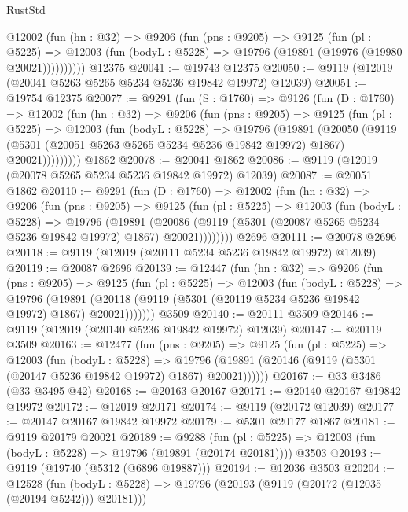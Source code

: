 \begin{lexlean}{RustStd}
\begin{coremodule}
        @12002
          (fun (hn : @32) =>
          @9206
            (fun (pns : @9205) =>
            @9125
              (fun (pl : @5225) =>
              @12003 (fun (bodyL : @5228) => @19796 (@19891 (@19976 (@19980 @20021))))))))))
    @12375
@20041 := @19743 @12375
@20050 := @9119 (@12019 (@20041 @5263 @5265 @5234 @5236 @19842 @19972) @12039)
@20051 := @19754 @12375
@20077 := @9291
    (fun (S : @1760) =>
    @9126
      (fun (D : @1760) =>
      @12002
        (fun (hn : @32) =>
        @9206
          (fun (pns : @9205) =>
          @9125
            (fun (pl : @5225) =>
            @12003
              (fun (bodyL : @5228) =>
              @19796
                (@19891
                  (@20050
                    (@9119
                      (@5301 (@20051 @5263 @5265 @5234 @5236 @19842 @19972) @1867)
                      @20021)))))))))
    @1862
@20078 := @20041 @1862
@20086 := @9119 (@12019 (@20078 @5265 @5234 @5236 @19842 @19972) @12039)
@20087 := @20051 @1862
@20110 := @9291
    (fun (D : @1760) =>
    @12002
      (fun (hn : @32) =>
      @9206
        (fun (pns : @9205) =>
        @9125
          (fun (pl : @5225) =>
          @12003
            (fun (bodyL : @5228) =>
            @19796
              (@19891
                (@20086 (@9119 (@5301 (@20087 @5265 @5234 @5236 @19842 @19972) @1867) @20021))))))))
    @2696
@20111 := @20078 @2696
@20118 := @9119 (@12019 (@20111 @5234 @5236 @19842 @19972) @12039)
@20119 := @20087 @2696
@20139 := @12447
    (fun (hn : @32) =>
    @9206
      (fun (pns : @9205) =>
      @9125
        (fun (pl : @5225) =>
        @12003
          (fun (bodyL : @5228) =>
          @19796
            (@19891 (@20118 (@9119 (@5301 (@20119 @5234 @5236 @19842 @19972) @1867) @20021)))))))
    @3509
@20140 := @20111 @3509
@20146 := @9119 (@12019 (@20140 @5236 @19842 @19972) @12039)
@20147 := @20119 @3509
@20163 := @12477
    (fun (pns : @9205) =>
    @9125
      (fun (pl : @5225) =>
      @12003
        (fun (bodyL : @5228) =>
        @19796 (@19891 (@20146 (@9119 (@5301 (@20147 @5236 @19842 @19972) @1867) @20021))))))
@20167 := @33 @3486 (@33 @3495 @42)
@20168 := @20163 @20167
@20171 := @20140 @20167 @19842 @19972
@20172 := @12019 @20171
@20174 := @9119 (@20172 @12039)
@20177 := @20147 @20167 @19842 @19972
@20179 := @5301 @20177 @1867
@20181 := @9119 @20179 @20021
@20189 := @9288
    (fun (pl : @5225) => @12003 (fun (bodyL : @5228) => @19796 (@19891 (@20174 @20181))))
    @3503
@20193 := @9119 (@19740 (@5312 (@6896 @19887)))
@20194 := @12036 @3503
@20204 := @12528
    (fun (bodyL : @5228) => @19796 (@20193 (@9119 (@20172 (@12035 (@20194 @5242))) @20181)))

\end{coremodule}
\end{lexlean}
